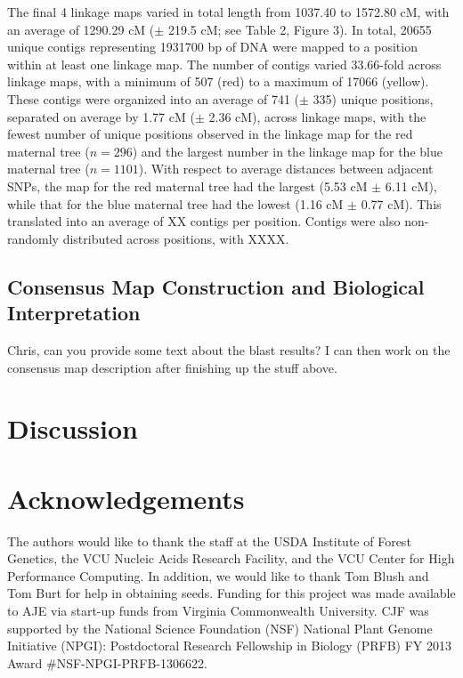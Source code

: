 \documentclass[11pt]{article}
\begin{document}
The final \num{4} linkage maps varied in total length from 1037.40 to 1572.80 cM, with an average of 1290.29 cM ($\pm$ 219.5 cM; see Table 2, Figure 3). 
In total, \num{20655} unique contigs representing \num{1931700} bp of DNA were mapped to a position within at least one linkage map. 
The number of contigs varied 33.66-fold across linkage maps, with a minimum of 507 (red) to a maximum of \num{17066} (yellow). 
These contigs were organized into an average of 741 ($\pm$ 335) unique positions, separated on average
by 1.77 cM ($\pm$ 2.36 cM), across linkage maps, with the fewest number of unique positions observed 
in the linkage map for the red maternal tree ($n = 296$) and the largest number in the linkage map for the blue maternal 
tree ($n = 1101$). With respect to average distances between adjacent SNPs, the map for the red 
maternal tree had the largest (5.53 cM $\pm$ 6.11 cM), while that for the blue maternal tree had the lowest (1.16 cM $\pm$ 0.77 cM).
This translated into an average of XX contigs per position. Contigs were also non-randomly distributed across positions, with XXXX.

\subsection*{Consensus Map Construction and Biological Interpretation}

Chris, can you provide some text about the blast results? I can then work on the consensus map description after finishing up the stuff above.

\section*{Discussion}

\section*{Acknowledgements}

The authors would like to thank the staff at the USDA Institute of Forest Genetics, the 
VCU Nucleic Acids Research Facility, and the VCU Center for High Performance Computing. 
In addition, we would like to thank Tom Blush and Tom Burt for help in obtaining 
seeds. Funding for this project was made available to AJE via start-up funds from Virginia 
Commonwealth University. CJF was supported by the National Science Foundation (NSF) National Plant Genome 
Initiative (NPGI): Postdoctoral Research Fellowship in Biology (PRFB) FY 2013 Award \#NSF-NPGI-PRFB-1306622.
\end{document}
